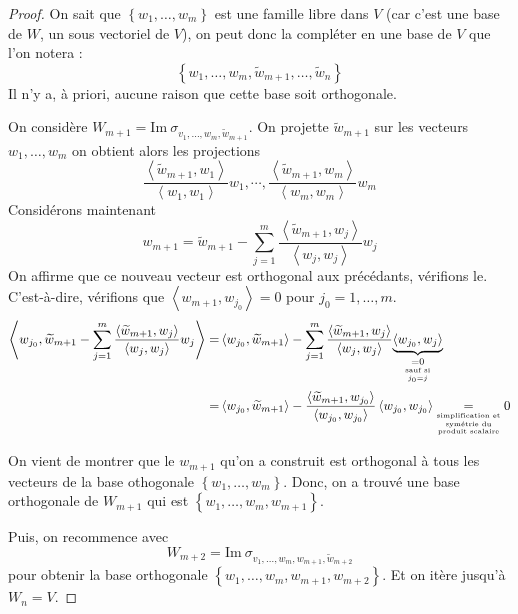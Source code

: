 \documentclass[a4paper,10pt]{article}
\newcommand{\mt}[1]{\widetilde{ #1 }} %
\newcommand{\grp}[1]{\left\langle #1 \right\rangle} %
\newcommand{\set}[1]{\left\lbrace #1 \right\rbrace } %
\newcommand{\im}{\mathrm{Im}\:} %
\newcommand{\underb}[2]{\underset{ #1 }{\underbrace{ #2 }}} %
\begin{document}
    \begin{proof}
     On sait que $\set{w_1,\hdots,w_m}$ est une famille libre dans $V$ (car c'est une base de $W$, un sous vectoriel de $V$), on peut donc la compléter en une base de $V$ que l'on notera :
      $$\set{w_1,\hdots,w_m,\mt{w}_{m+1},\hdots,\mt{w}_n}$$
     Il n'y a, à priori, aucune raison que cette base soit orthogonale.

     On considère $W_{m+1}=\im \sigma_{v_1,\hdots,w_m,\mt{w}_{m+1}}$. On projette $\mt{w}_{m+1}$ sur les vecteurs $w_1,\hdots,w_m$ on obtient alors les projections
      $$\frac{\grp{\mt{w}_{m+1},w_1}}{\grp{w_1,w_1}}w_1, \cdots, \frac{\grp{\mt{w}_{m+1},w_m}}{\grp{w_m,w_m}}w_m$$
     Considérons maintenant
      $$w_{m+1}=\mt{w}_{m+1}-\sum^m_{j=1}\frac{ \grp{\mt{w}_{m+1},w_j} }{\grp{w_j,w_j}}w_j$$
     On affirme que ce nouveau vecteur est orthogonal aux précédants, vérifions le. C'est-à-dire, vérifions que $\grp{w_{m+1},w_{j_0}}=0$ pour $j_0=1,\hdots,m$.
     \begin{eqnarray*}
      \grp{w_{j_0},\mt{w}_{m+1}-\sum^m_{j=1}\frac{ \grp{\mt{w}_{m+1},w_j} }{\grp{w_j,w_j}}w_j} =&
      \displaystyle \grp{w_{j_0},\mt{w}_{m+1}} - \sum^m_{j=1}\frac{ \grp{\mt{w}_{m+1},w_j} }{\grp{w_j,w_j}}
      \underb{
       \underset{
        \underset{j_0=j}{\text{sauf si}}
       }{=0}
      }
      {\grp{w_{j_0},w_j}
      }\\
      =&\displaystyle \grp{w_{j_0},\mt{w}_{m+1}} - \frac{\grp{\mt{w}_{m+1},w_{j_0}}} {\grp{w_{j_0},w_{j_0}}} \grp{w_{j_0},w_{j_0}}
      \underset {
       \overset
        { \text{\begin{tiny}simplification et\end{tiny}} }
        {
        \overset
        { \text{\begin{tiny}symétrie du\end{tiny}} }
        { \text{\begin{tiny}produit scalaire\end{tiny}} }
        }
      }
      {=}0
     \end{eqnarray*}

     On vient de montrer que le $w_{m+1}$ qu'on a construit est orthogonal à tous les vecteurs de la base othogonale $\set{w_1,\hdots,w_m}$. Donc, on a trouvé une base orthogonale de $W_{m+1}$ qui est $\set{w_1,\hdots,w_m,w_{m+1}}$.

     Puis, on recommence avec $$W_{m+2}=\im \sigma_{v_1,\hdots,w_m,w_{m+1},\mt{w}_{m+2}}$$ pour obtenir la base orthogonale $\set{w_1,\hdots,w_m,w_{m+1},w_{m+2}}$. Et on itère jusqu'à $W_n=V$.
    \end{proof}
\end{document}
